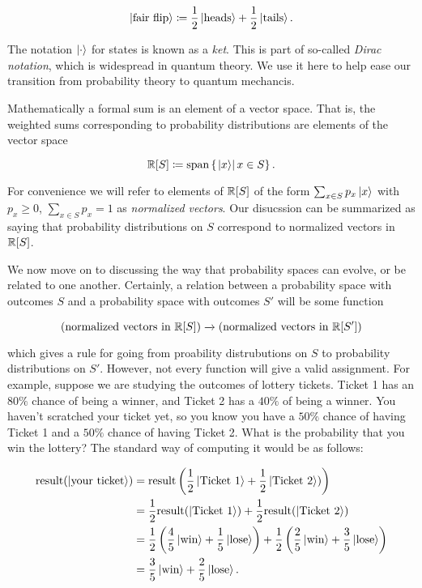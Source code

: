 $$\ket{\text{fair flip}}\coloneqq\frac{1}{2}\ket{\text{heads}}+\frac{1}{2}\ket{\text{tails}}.$$

The notation $\ket{\cdot}$ for states is known as a \textit{ket}. This is part of so-called \textit{Dirac notation}, which is widespread in quantum theory. We use it here to help ease our transition from probability theory to quantum mechancis.

Mathematically a formal sum is an element of a vector space. That is, the weighted sums corresponding to probability distributions are elements of the vector space

$$\mathbb{R}[S]\coloneqq \text{span} \left\{\left.\ket{x}\right| x\in S\right\}.$$

For convenience we will refer to elements of $\mathbb{R}[S]$ of the form $\sum_{x\in S}p_x \ket{x}$ with $p_x\geq 0$, $\sum_{x\in S}p_x=1$ as \textit{normalized vectors}. Our disucssion can be summarized as saying that probability distributions on $S$ correspond to normalized vectors in $\mathbb{R}[S]$.

We now move on to discussing the way that probability spaces can evolve, or be related to one another. Certainly, a relation between a probability space with outcomes $S$ and a probability space with outcomes $S'$ will be some function

$$\left(\text{normalized vectors in }\mathbb{R}[S]\right)\xrightarrow{}\left(\text{normalized vectors in }\mathbb{R}[S']\right)$$

which gives a rule for going from proability distrubutions on $S$ to probability distributions on $S'$. However, not every function will give a valid assignment. For example, suppose we are studying the outcomes of lottery tickets. Ticket 1 has an $80\%$ chance of being a winner, and Ticket 2 has a $40\%$ of being a winner. You haven't scratched your ticket yet, so you know you have a $50\%$ chance of having Ticket 1 and a $50\%$ chance of having Ticket 2. What is the probability that you win the lottery? The standard way of computing it would be as follows:

\begin{align*}
\text{result}(\ket{\text{your ticket}})&=\text{result}\left(\frac{1}{2}\ket{\text{Ticket 1}}+\frac{1}{2}\ket{\text{Ticket 2}})\right)\\
&=\frac{1}{2}\text{result}(\ket{\text{Ticket 1}})+\frac{1}{2}\text{result}(\ket{\text{Ticket 2}})\\
&=\frac{1}{2}\left(\frac{4}{5}\ket{\text{win}}+\frac{1}{5}\ket{\text{lose}}\right)+\frac{1}{2}\left(\frac{2}{5}\ket{\text{win}}+\frac{3}{5}\ket{\text{lose}}\right)\\
&=\frac{3}{5}\ket{\text{win}}+\frac{2}{5}\ket{\text{lose}}.
\end{align*}

